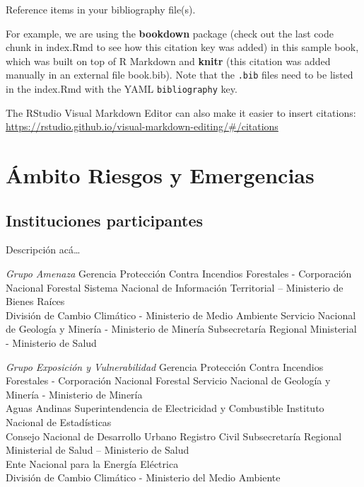 \documentclass[
]{book}
\theoremstyle{definition}
\theoremstyle{definition}
\theoremstyle{definition}
\theoremstyle{definition}
\theoremstyle{remark}
\begin{document}
Reference items in your bibliography file(s).

For example, we are using the \textbf{bookdown} package \citep{R-bookdown} (check out the last code chunk in index.Rmd to see how this citation key was added) in this sample book, which was built on top of R Markdown and \textbf{knitr} \citep{xie2015} (this citation was added manually in an external file book.bib).
Note that the \texttt{.bib} files need to be listed in the index.Rmd with the YAML \texttt{bibliography} key.

The RStudio Visual Markdown Editor can also make it easier to insert citations: \url{https://rstudio.github.io/visual-markdown-editing/\#/citations}

\hypertarget{uxe1mbito-riesgos-y-emergencias}{%
\chapter{Ámbito Riesgos y Emergencias}\label{uxe1mbito-riesgos-y-emergencias}}

\hypertarget{instituciones-participantes-4}{%
\section*{Instituciones participantes}\label{instituciones-participantes-4}}

Descripción acá\ldots{}

\emph{Grupo Amenaza}
Gerencia Protección Contra Incendios Forestales - Corporación Nacional Forestal
Sistema Nacional de Información Territorial -- Ministerio de Bienes Raíces\\
División de Cambio Climático - Ministerio de Medio Ambiente
Servicio Nacional de Geología y Minería - Ministerio de Minería
Subsecretaría Regional Ministerial - Ministerio de Salud

\emph{Grupo Exposición y Vulnerabilidad}
Gerencia Protección Contra Incendios Forestales - Corporación Nacional Forestal
Servicio Nacional de Geología y Minería - Ministerio de Minería\\
Aguas Andinas
Superintendencia de Electricidad y Combustible
Instituto Nacional de Estadísticas\\
Consejo Nacional de Desarrollo Urbano
Registro Civil
Subsecretaría Regional Ministerial de Salud -- Ministerio de Salud\\
Ente Nacional para la Energía Eléctrica\\
División de Cambio Climático - Ministerio del Medio Ambiente
\end{document}
